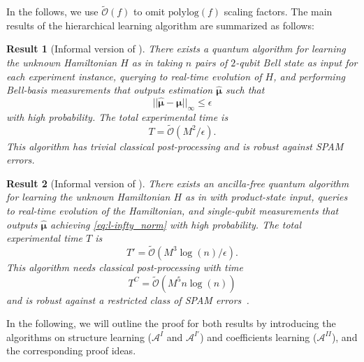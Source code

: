 \documentclass[twocolumn,superscriptaddress,aps,showpacs,amsmath,amstex,amssymb,citeautoscript,floatfix,pra,preprintnumbers]{revtex4-2}
\newcounter{alg}
\newtheorem{result}{Result}
\theoremstyle{plain}
\theoremstyle{plain}
\theoremstyle{plain}
\theoremstyle{plain}
\theoremstyle{plain}
\theoremstyle{plain}
\begin{document}
In the follows, we use $\widetilde{\mathcal{O}}(f)$ to omit $\text{polylog}(f)$ scaling factors. The main results of the hierarchical learning algorithm are summarized as follows: 

\begin{result}[Informal version of ]
    There exists a quantum algorithm for learning the unknown Hamiltonian $H$ as in   taking $n$ pairs of $2$-qubit Bell state as input for each experiment instance, querying to real-time evolution of $H$, and performing Bell-basis measurements that outputs estimation $\hat{\boldsymbol{\mu}}$ such that 
    \begin{equation}
    \label{eq:l-infty_norm}
        ||\hat{\boldsymbol{\mu}}-\boldsymbol{\mu}||_\infty \leq \epsilon
    \end{equation}
    with high probability. The total experimental time is
    \begin{equation}
        T = \widetilde{\mathcal{O}}\left(M^2/\epsilon\right).
    \end{equation}
    This algorithm has trivial classical post-processing and is robust against SPAM errors.
\end{result}

\begin{result}[Informal version of ]
    There exists an ancilla-free quantum algorithm for learning the unknown Hamiltonian $H$ as in   with product-state input, queries to real-time evolution of the Hamiltonian, and single-qubit measurements that outputs $\hat{\boldsymbol{\mu}}$ achieving \eqref{eq:l-infty_norm} with high probability. The total experimental time $T$ is 
    \begin{equation}
        T' = \widetilde{\mathcal{O}}\left(M^3\log(n)/\epsilon\right).
    \end{equation}
    This algorithm needs classical post-processing with time
    \begin{equation}
        T^C = \widetilde{\mathcal{O}}(M^5n\log(n))
    \end{equation}
    and is robust against a restricted class of SPAM errors~\cite{Flammia2021paulierror}.
\end{result}


In the following, we will outline the proof for both results by introducing the algorithms on structure learning ($\mathcal{A}^I$ and $\mathcal{A}^{I'}$) and coefficients learning ($\mathcal{A}^{II}$), and the corresponding proof ideas.
\end{document}
